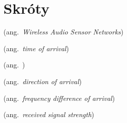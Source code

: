 % 
\chapter*{Skróty}\label{sec:skroty}
\noindent\vspace{-\topsep-\partopsep-\parsep} %
\begin{description}[labelwidth=*]
  \item [WASN] (ang.\ \emph{Wireless Audio Sensor Networks}) %
  \item [TOA] (ang.\ \emph{time of arrival})
  \item [AOA] (ang.\ )
  \item [DOA] (ang.\ \emph{direction of arrival})
  \item [FDOA] (ang.\ \emph{frequency difference of arrival})
  \item [RSS] (ang.\ \emph{received signal strength})
  \item 
\end{description}
